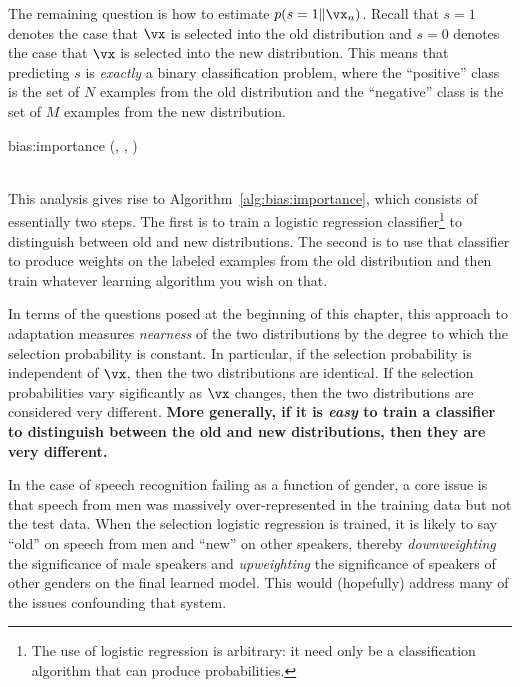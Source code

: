 The remaining question is how to estimate $p(s=1 \| \vx_n)$.
Recall that $s=1$ denotes the case that $\vx$ is selected into the old distribution and $s=0$ denotes the case that $\vx$ is selected into the new distribution.
This means that predicting $s$ is \emph{exactly} a binary classification problem, where the ``positive'' class is the set of $N$ examples from the old distribution and the ``negative'' class is the set of $M$ examples from the new distribution.

\newalgorithm%
  {bias:importance}%
  {(, , \VAR{$\cA$})}
  {
     
\\
    \\ 
     
  }

This analysis gives rise to Algorithm~\ref{alg:bias:importance}, which consists of essentially two steps. The first is to train a logistic regression classifier\footnote{The use of logistic regression is arbitrary: it need only be a classification algorithm that can produce probabilities.} to distinguish between old and new distributions. The second is to use that classifier to produce weights on the labeled examples from the old distribution and then train whatever learning algorithm you wish on that.

In terms of the questions posed at the beginning of this chapter, this approach to adaptation measures \emph{nearness} of the two distributions by the degree to which the selection probability is constant. In particular, if the selection probability is independent of $\vx$, then the two distributions are identical. If the selection probabilities vary sigificantly as $\vx$ changes, then the two distributions are considered very different. \textbf{More generally, if it is \emph{easy} to train a classifier to distinguish between the old and new distributions, then they are very different.}

In the case of speech recognition failing as a function of gender, a core issue is that speech from men was massively over-represented in the training data but not the test data.
When the selection logistic regression is trained, it is likely to say ``old'' on speech from men and ``new'' on other speakers, thereby \emph{downweighting} the significance of male speakers and \emph{upweighting} the significance of speakers of other genders on the final learned model. This would (hopefully) address many of the issues confounding that system.

